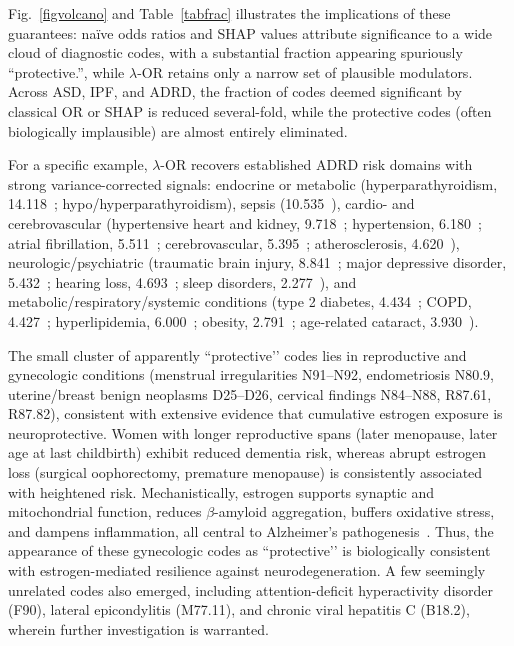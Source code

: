 \documentclass[pdflatex,sn-mathphys-num]{sn-jnl}%
\newcommand{\SPOR}{\textrm{$\lambda$-OR}}
\theoremstyle{thmstyleone}%
\theoremstyle{thmstyletwo}%
\theoremstyle{thmstylethree}%
\begin{document}
Fig.~\ref{figvolcano} and Table~\ref{tabfrac}  illustrates the implications of these guarantees:   naïve odds ratios and SHAP values attribute significance to a wide cloud of diagnostic codes, with a substantial fraction appearing spuriously “protective.”, while  $\SPOR$  retains only a narrow set of plausible modulators. Across ASD, IPF, and ADRD, the fraction of codes deemed significant by classical OR or SHAP is reduced several-fold, while the protective codes (often biologically implausible) are almost entirely eliminated.

 For a specific example, $\SPOR$  recovers established ADRD risk domains with strong variance-corrected signals: endocrine or metabolic (hyperparathyroidism, 14.118~\cite{HYPERPARATHYROIDISMmathur2022}; hypo/hyperparathyroidism), sepsis (10.535~\cite{SEPSISzeng2024}), cardio- and cerebrovascular (hypertensive heart and kidney, 9.718~\cite{CKDkelly2022}; hypertension, 6.180~\cite{HYPERTENSIONcarey2023}; atrial fibrillation, 5.511~\cite{ATRIALFIBRpapanastasiou2021}; cerebrovascular, 5.395~\cite{CEREBROVASCULARlove2016}; atherosclerosis, 4.620~\cite{ATHEROSCLEROSISnordestgaard2022}), neurologic/psychiatric (traumatic brain injury, 8.841~\cite{TBIgu2022}; major depressive disorder, 5.432~\cite{DEPRESSIONsaiz2021}; hearing loss, 4.693~\cite{HEARINGlitke2021}; sleep disorders, 2.277~\cite{SLEEPchoe2022}), and metabolic/respiratory/systemic conditions (type 2 diabetes, 4.434~\cite{T2DMathanasaki2022}; COPD, 4.427~\cite{COPDwang2022}; hyperlipidemia, 6.000~\cite{HYPERLIPIDEMIAezkurdia2023}; obesity, 2.791~\cite{OBESITYbeydoun2008}; age-related cataract, 3.930~\cite{CATARACTjun2012}).



The small cluster of apparently ``protective’’ codes lies in reproductive and gynecologic conditions (menstrual irregularities N91–N92, endometriosis N80.9, uterine/breast benign neoplasms D25–D26, cervical findings N84–N88, R87.61, R87.82), consistent with extensive evidence that cumulative estrogen exposure is neuroprotective. Women with longer reproductive spans (later menopause, later age at last childbirth) exhibit reduced dementia risk, whereas abrupt estrogen loss (surgical oophorectomy, premature menopause) is consistently associated with heightened risk. Mechanistically, estrogen supports synaptic and mitochondrial function, reduces $\beta$-amyloid aggregation, buffers oxidative stress, and dampens inflammation, all central to Alzheimer’s pathogenesis~\cite{zarate2017role,Georgakis2016}. Thus, the appearance of these gynecologic codes as “protective’’ is biologically consistent with estrogen-mediated resilience against neurodegeneration.  
A few seemingly unrelated codes also emerged, including attention-deficit hyperactivity disorder (F90), lateral epicondylitis (M77.11), and chronic viral hepatitis C (B18.2),
wherein further investigation is warranted.
 
\end{document}
